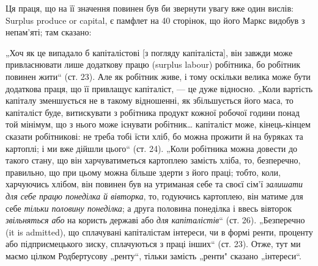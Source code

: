 \parcont{}  %
Ця праця, що на її значення повинен був би звернути увагу вже один
вислів: Surplus produce or capital, є памфлет на 40 сторінок, що його
Маркс видобув з непам’яті; там сказано:

„Хоч як це випадало б капіталістові [з погляду капіталіста], він
завжди може привласнювати лише додаткову працю (surplus labour) робітника,
бо робітник повинен жити“ (ст. 23). Але як робітник живе,
і тому оскільки велика може бути додаткова праця, що її привлащує
капіталіст, — це дуже відносно. „Коли вартість капіталу зменшується
не в такому відношенні, як збільшується його маса, то капіталіст буде,
витискувати з робітника продукт кожної робочої години понад той мінімум,
що з нього може існувати робітник\dots{} капіталіст може, кінець-кінцем
сказати робітникові: не треба тобі їсти хліб, бо можна прожити й на
буряках та картоплі; і ми вже дійшли цього“ (ст. 24). „Коли робітника
можна довести до такого стану, що він харчуватиметься картоплею замість
хліба, то, безперечно, правильно, що при цьому можна більше здерти з
його праці; тобто, коли, харчуючись хлібом, він повинен був на утриманая
себе та своєї сім’ї  \emph{залишати для себе працю понеділка й вівторка},
то, годуючись картоплею, він матиме для себе  \emph{тільки половину понеділка};
а друга половина понеділка і ввесь вівторок  \emph{звільняться або} на користь
державі або  \emph{для капіталістів}“ (ст. 26). „Безперечно (it is admitted),
що сплачувані капіталістам інтереси, чи в формі ренти, проценту або
підприємецького зиску, сплачуються з праці інших“ (ст. 23). Отже, тут
ми маємо цілком Родбертусову „ренту“, тільки замість „ренти" сказано
„інтереси“.

